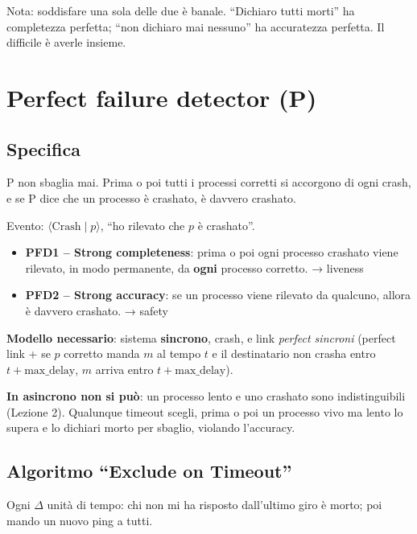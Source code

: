 Nota: soddisfare una sola delle due è banale. ``Dichiaro tutti morti'' ha completezza perfetta; ``non dichiaro mai nessuno'' ha accuratezza perfetta. Il difficile è averle insieme.

\section{Perfect failure detector (P)}

\subsection{Specifica}

\begin{inbreve}

P non sbaglia mai. Prima o poi tutti i processi corretti si accorgono di ogni crash, e se P dice che un processo è crashato, è davvero crashato.

\end{inbreve}

Evento: \(\langle \text{Crash} \mid p \rangle\), ``ho rilevato che \(p\) è crashato''.

\begin{itemize}
\tightlist
\item
  \textbf{PFD1 -- Strong completeness}: prima o poi ogni processo crashato viene rilevato, in modo permanente, da \textbf{ogni} processo corretto. → liveness
\item
  \textbf{PFD2 -- Strong accuracy}: se un processo viene rilevato da qualcuno, allora è davvero crashato. → safety
\end{itemize}

\textbf{Modello necessario}: sistema \textbf{sincrono}, crash, e link \emph{perfect sincroni} (perfect link + se \(p\) corretto manda \(m\) al tempo \(t\) e il destinatario non crasha entro \(t + \text{max\_delay}\), \(m\) arriva entro \(t + \text{max\_delay}\)).

\textbf{In asincrono non si può}: un processo lento e uno crashato sono indistinguibili (Lezione 2). Qualunque timeout scegli, prima o poi un processo vivo ma lento lo supera e lo dichiari morto per sbaglio, violando l'accuracy.

\subsection{Algoritmo ``Exclude on Timeout''}

Ogni \(\Delta\) unità di tempo: chi non mi ha risposto dall'ultimo giro è morto; poi mando un nuovo ping a tutti.

